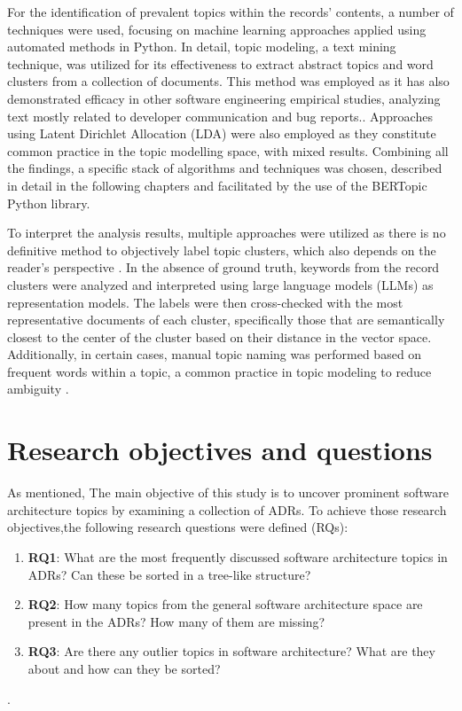         For the identification of prevalent topics within the records' contents, a number of techniques were used, focusing on machine learning approaches applied using automated methods in Python. In detail, topic modeling, a text mining technique, was utilized for its effectiveness to extract abstract topics and word clusters from a collection of documents. This method was employed as it has also demonstrated efficacy in other software engineering empirical studies, analyzing text mostly related to developer communication and bug reports.\cite{Topic_modeling_in_software_engineering_research}. Approaches using Latent Dirichlet Allocation (LDA) were also employed as they constitute common practice in the topic modelling space, with mixed results. Combining all the findings, a specific stack of algorithms and techniques was chosen, described in detail in the following chapters and facilitated by the use of the BERTopic Python library. \cite{bertTopic}

        To interpret the analysis results, multiple approaches were utilized as there is no definitive method to objectively label topic clusters, which also depends on the reader's perspective \cite{datasciencecentralTopicModeling}. In the absence of ground truth, keywords from the record clusters were analyzed and interpreted using large language models (LLMs) as representation models. The labels were then cross-checked with the most representative documents of each cluster, specifically those that are semantically closest to the center of the cluster based on their distance in the vector space. Additionally, in certain cases, manual topic naming was performed based on frequent words within a topic, a common practice in topic modeling to reduce ambiguity \cite{Topic_modeling_in_software_engineering_research}.
        
    \section{Research objectives and questions}
        As mentioned, The main objective of this study is to uncover prominent software architecture topics by examining a collection of ADRs. To achieve those research objectives,the following research questions were defined (RQs):

        \begin{enumerate}
            \item \textbf{RQ1}: What are the most frequently discussed software architecture topics in ADRs? Can these be sorted in a tree-like structure?
            \item \textbf{RQ2}: How many topics from the general software architecture space are present in the ADRs? How many of them are missing?
            \item \textbf{RQ3}: Are there any outlier topics in software architecture? What are they about and how can they be sorted?  
        \end{enumerate}. 

